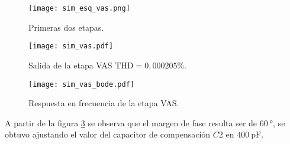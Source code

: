 
\begin{figure}[H]
	\centering
	\texttt{[image: sim\_esq\_vas.png]}
	\caption{Primeras dos etapas.}
	\label{fig:sim_salida}
\end{figure}

\begin{figure}[H]
	\centering
	\texttt{[image: sim\_vas.pdf]}
	\caption{Salida de la etapa VAS $\mathrm{THD}=0,000205\%$.}
	\label{fig:sim_vas}
\end{figure}

\begin{figure}[H]
	\centering
	\texttt{[image: sim\_vas\_bode.pdf]}
	\caption{Respuesta en frecuencia de la etapa VAS.}
	\label{fig:sim_bode_vas}
\end{figure}

A partir de la figura \ref{fig:sim_bode_vas} se observa que el margen de fase resulta ser de $\SI{60}{\degree}$, se obtuvo ajustando el valor del capacitor de compensación $C2$ en $\SI{400}{\pico\farad}$.
